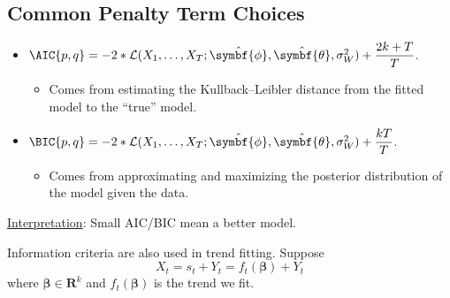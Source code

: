 \subsection*{Common Penalty Term Choices}
\begin{itemize}
    \item $ \AIC{p,q}=-2\log*{\mathcal{L}(X_1,\ldots,X_T;\hat{\symbf{\phi}},\hat{\symbf{\theta}},\sigma_W^2)}+\dfrac{2k+T}{T} $.
          \begin{itemize}
              \item Comes from estimating the Kullback–Leibler distance from the fitted model to the ``true'' model.
          \end{itemize}
    \item $ \BIC{p,q}=-2\log*{\mathcal{L}(X_1,\ldots,X_T;\hat{\symbf{\phi}},\hat{\symbf{\theta}},\sigma_W^2)}+\dfrac{k\log{T}}{T} $.
          \begin{itemize}
              \item Comes from approximating and maximizing the posterior distribution of the model given the data.
          \end{itemize}
\end{itemize}
\underline{Interpretation}: Small AIC/BIC mean a better model.

Information criteria are also used in trend fitting. Suppose
\[ X_t=s_t+Y_t=f_t(\symbf{\beta})+Y_t \]
where $ \symbf{\beta}\in\mathbf{R}^k $ and $ f_t(\symbf{\beta}) $ is the trend we fit.

